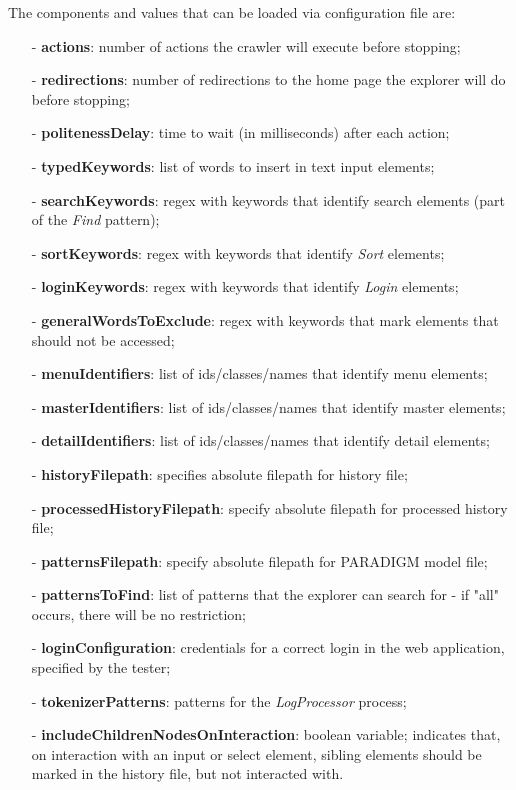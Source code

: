 \documentclass[10pt, conference, compsocconf]{IEEEtran}
\begin{document}
The components and values that can be loaded via configuration file are: 
\begin{itemize}
\item[-] \textbf{actions}: number of actions the crawler will execute before stopping;
\item[-] \textbf{redirections}: number of redirections to the home page the explorer will do before stopping; 
\item[-] \textbf{politenessDelay}: time to wait (in milliseconds) after each action;
\item[-] \textbf{typedKeywords}: list of words to insert in text input elements;
\item[-] \textbf{searchKeywords}: regex with keywords that identify search elements (part of the \textit{Find} pattern);
\item[-] \textbf{sortKeywords}: regex with keywords that identify \textit{Sort} elements;
\item[-] \textbf{loginKeywords}: regex with keywords that identify \textit{Login} elements;
\item[-] \textbf{generalWordsToExclude}: regex with keywords that mark elements that should not be accessed;
\item[-] \textbf{menuIdentifiers}: list of ids/classes/names that identify menu elements;
\item[-] \textbf{masterIdentifiers}: list of ids/classes/names that identify master elements;
\item[-] \textbf{detailIdentifiers}: list of ids/classes/names that identify detail elements;
\item[-] \textbf{historyFilepath}: specifies absolute filepath for history file;
\item[-] \textbf{processedHistoryFilepath}: specify absolute filepath for processed history file;
\item[-] \textbf{patternsFilepath}: specify absolute filepath for PARADIGM model file;
\item[-] \textbf{patternsToFind}: list of patterns that the explorer can search for - if "all" occurs, there will be no restriction;
\item[-] \textbf{loginConfiguration}: credentials for a correct login in the web application, specified by the tester;		
\item[-] \textbf{tokenizerPatterns}: patterns for the \textit{LogProcessor} process;
\item[-] \textbf{includeChildrenNodesOnInteraction}: boolean variable; indicates that, on interaction with an input or select element, sibling elements should be marked in the history file, but not interacted with.
\end{itemize}
\end{document}
